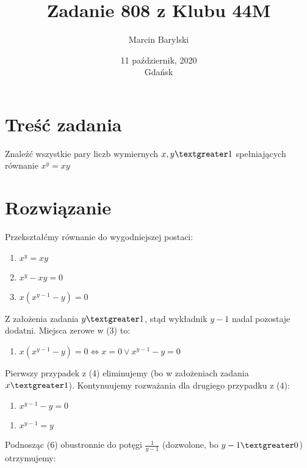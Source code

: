 \documentclass[10pt,onecolumn]{article}
\title{Zadanie 808 z Klubu 44M}
\author{Marcin Barylski}
\date{\small{11 październik, 2020 \\ Gdańsk}}
\begin{document}
\maketitle

\section{Treść zadania}

Znaleźć wszystkie pary liczb wymiernych $x, y \textgreater 1$ spełniających równanie $x^y = xy$

\section{Rozwiązanie}

Przekształćmy równanie do wygodniejszej postaci: \\

\begin{enumerate}[(1)]
\item $x^y = xy$ \\
\item $x^y - xy = 0$ \\
\item $x(x^{y-1}-y) = 0$ \\
\end{enumerate}

Z założenia zadania $y \textgreater 1$, stąd wykładnik $y-1$ nadal pozostaje dodatni. Miejsca zerowe w (3) to: \\

\begin{enumerate}[(4)]
\item $x(x^{y-1}-y) = 0 \iff x = 0 \lor x^{y-1}-y = 0$ \\
\end{enumerate}

Pierwszy przypadek z (4) eliminujemy (bo w założeniach zadania $x \textgreater 1$). Kontynuujemy rozważania dla drugiego przypadku z (4):

\begin{enumerate}[(5)]
\item $x^{y-1}-y = 0$\\
\end{enumerate}
\begin{enumerate}[(6)]
\item $x^{y-1} = y$\\
\end{enumerate}

Podnosząc (6) obustronnie do potęgi $\frac{1}{y-1}$ (dozwolone, bo $y-1 \textgreater 0$) otrzymujemy:
\end{document}
